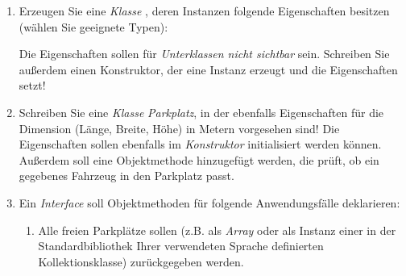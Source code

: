 \documentclass{lehramt-informatik-aufgabe}
\begin{document}
\begin{enumerate}


\item Erzeugen Sie eine \emph{Klasse}
, deren Instanzen folgende Eigenschaften besitzen (wählen
Sie geeignete Typen):


Die Eigenschaften sollen für \emph{Unterklassen nicht sichtbar} sein.
Schreiben Sie außerdem einen Konstruktor, der eine Instanz erzeugt und
die Eigenschaften setzt!

\begin{antwort}
\end{antwort}


\item Schreiben Sie eine \emph{Klasse} \emph{Parkplatz}, in der
ebenfalls Eigenschaften für die Dimension (Länge, Breite, Höhe) in
Metern vorgesehen sind! Die Eigenschaften sollen ebenfalls im
\emph{Konstruktor} initialisiert werden können. Außerdem soll eine
Objektmethode hinzugefügt werden, die prüft, ob ein gegebenes Fahrzeug
in den Parkplatz passt.

\begin{antwort}
\end{antwort}


\item Ein \emph{Interface}  soll Objektmethoden für
folgende Anwendungsfälle deklarieren:

\begin{enumerate}


\item Alle freien Parkplätze sollen (z.B. als \emph{Array} oder als
Instanz einer in der Standardbibliothek Ihrer verwendeten Sprache
definierten Kollektionsklasse) zurückgegeben werden.


\end{enumerate}
\end{enumerate}
\end{document}
